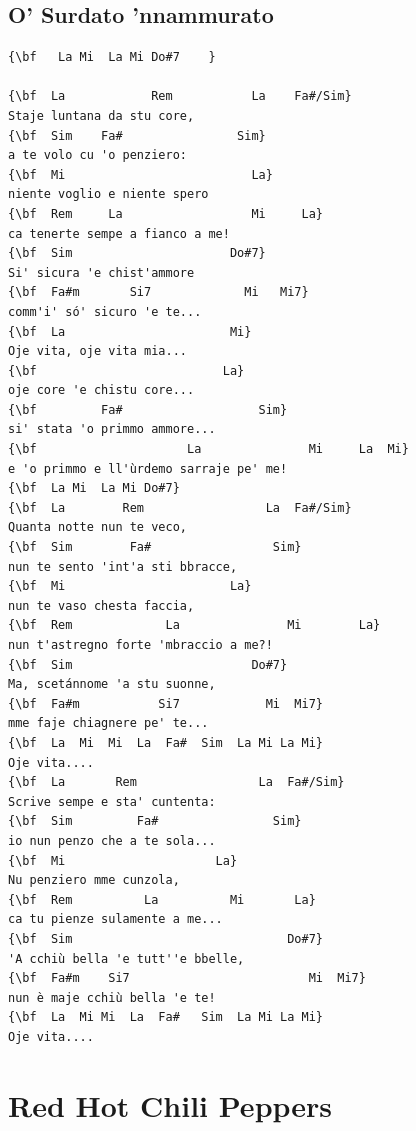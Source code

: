 \documentclass[a4paper]{article}
\begin{document}
\subsection{O' Surdato 'nnammurato}
\begin{Verbatim}[commandchars=\\\{\}]
{\bf   La Mi  La Mi Do#7    }

{\bf  La            Rem           La    Fa#/Sim}
Staje luntana da stu core,
{\bf  Sim    Fa#                Sim}
a te volo cu 'o penziero:
{\bf  Mi                          La}
niente voglio e niente spero
{\bf  Rem     La                  Mi     La}
ca tenerte sempe a fianco a me!
{\bf  Sim                      Do#7}
Si' sicura 'e chist'ammore
{\bf  Fa#m       Si7             Mi   Mi7}
comm'i' só' sicuro 'e te...
{\bf  La                       Mi}
Oje vita, oje vita mia...
{\bf                          La}
oje core 'e chistu core...
{\bf         Fa#                   Sim}
si' stata 'o primmo ammore...
{\bf                     La               Mi     La  Mi}
e 'o primmo e ll'ùrdemo sarraje pe' me!
{\bf  La Mi  La Mi Do#7}
{\bf  La        Rem                 La  Fa#/Sim}
Quanta notte nun te veco,
{\bf  Sim        Fa#                 Sim}
nun te sento 'int'a sti bbracce,
{\bf  Mi                       La}
nun te vaso chesta faccia,
{\bf  Rem             La               Mi        La}
nun t'astregno forte 'mbraccio a me?!
{\bf  Sim                         Do#7}
Ma, scetánnome 'a stu suonne,
{\bf  Fa#m           Si7            Mi  Mi7}
mme faje chiagnere pe' te...
{\bf  La  Mi  Mi  La  Fa#  Sim  La Mi La Mi}
Oje vita....
{\bf  La       Rem                 La  Fa#/Sim}
Scrive sempe e sta' cuntenta:
{\bf  Sim         Fa#                Sim}
io nun penzo che a te sola...
{\bf  Mi                     La}
Nu penziero mme cunzola,
{\bf  Rem          La          Mi       La}
ca tu pienze sulamente a me...
{\bf  Sim                              Do#7}
'A cchiù bella 'e tutt''e bbelle,
{\bf  Fa#m    Si7                         Mi  Mi7}
nun è maje cchiù bella 'e te!
{\bf  La  Mi Mi  La  Fa#   Sim  La Mi La Mi}
Oje vita....

\end{Verbatim}
\newpage
\section{Red Hot Chili Peppers}
\end{document}
